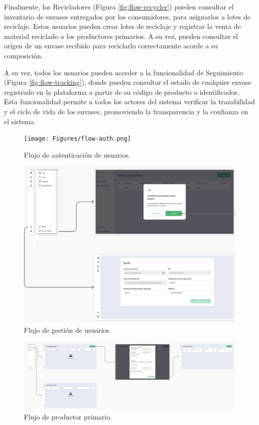 Finalmente, los Recicladores (Figura \ref{fig:flow-recycler}) pueden consultar el inventario de envases entregados por los consumidores, para asignarlos a lotes de reciclaje. Estos usuarios pueden crear lotes de reciclaje y registrar la venta de material reciclado a los productores primarios. A su vez, pueden consultar el origen de un envase recibido para reciclarlo correctamente acorde a su composición.

A su vez, todos los usuarios pueden acceder a la funcionalidad de Seguimiento (Figura \ref{fig:flow-tracking}), donde pueden consultar el estado de cualquier envase registrado en la plataforma a partir de su código de producto o identificador. Esta funcionalidad permite a todos los actores del sistema verificar la trazabilidad y el ciclo de vida de los envases, promoviendo la transparencia y la confianza en el sistema.


\begin{figure}[!htb]
	\centering
	\texttt{[image: Figures/flow-auth.png]}
	\caption{Flujo de autenticación de usuarios.}
  \label{fig:flow-auth}
\end{figure}

\begin{figure}[!htb]
	\centering
	\includegraphics[width=\linewidth]{Figures/flow-user.png}
	\caption{Flujo de gestión de usuarios.}
  \label{fig:flow-user}
\end{figure}

\begin{figure}[!htb]
	\centering
	\includegraphics[width=\linewidth]{Figures/flow-primary-producer.png}
	\caption{Flujo de productor primario.}
  \label{fig:flow-primary-producer}
\end{figure}

